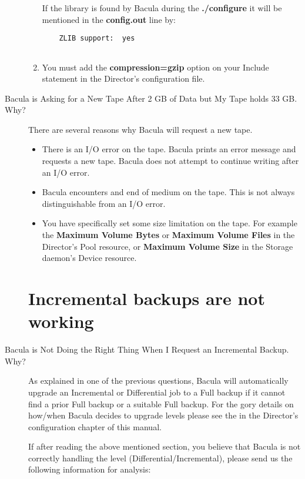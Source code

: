 \begin{description}
\begin{enumerate}
   If the library is found by Bacula during the {\bf ./configure} it will
   be mentioned in the {\bf config.out} line by:

\footnotesize
\begin{verbatim}
    ZLIB support:  yes
          
\end{verbatim}
\normalsize

\item You must add the {\bf compression=gzip} option on your  Include
   statement in the Director's configuration file.  
\end{enumerate}

\label{NewTape}
\item [Bacula is Asking for a New Tape After 2 GB of Data but My Tape
   holds 33 GB. Why?]
There are several reasons why Bacula will request a new tape.  

\begin{itemize}
\item There is an I/O error on the tape. Bacula prints an error message  and
   requests a new tape. Bacula does not attempt to continue writing  after an
   I/O error.  
\item Bacula encounters and end of medium on the tape. This is not always 
   distinguishable from an I/O error.  
\item You have specifically set some size limitation on the tape. For  example
   the {\bf Maximum Volume Bytes} or {\bf Maximum Volume Files}  in the
   Director's Pool resource, or {\bf Maximum Volume Size} in  the Storage
   daemon's Device resource.  
\end{itemize}

\label{LevelChanging}
\section{Incremental backups are not working}
\item [Bacula is Not Doing the Right Thing When I Request an Incremental
   Backup. Why?]
   As explained in one of the previous questions, Bacula will automatically
   upgrade an Incremental or Differential job to a Full backup if it cannot
   find a prior Full backup or a suitable Full backup.  For the gory
   details on how/when Bacula decides to upgrade levels please see the
    in the Director's configuration chapter of
   this manual.
   
   If after reading the above mentioned section, you believe that Bacula  is not
   correctly handling the level (Differential/Incremental),  please send us the
   following information for analysis:  


\end{description}
